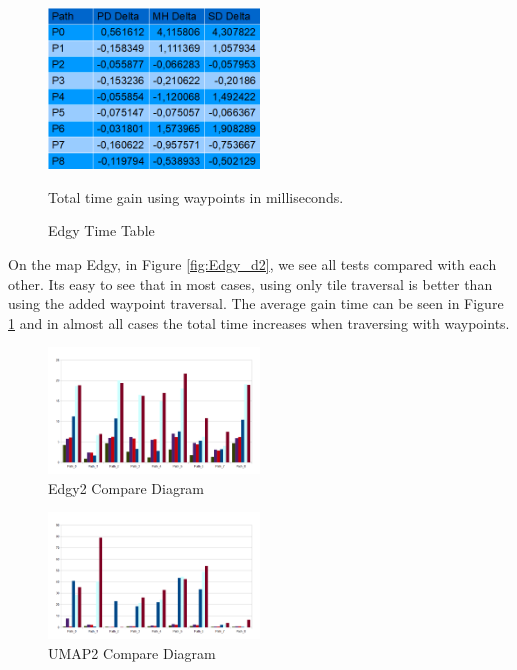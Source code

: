 \documentclass[a4paper]{article}
\begin{document}
\begin{figure}[h!]
\centering
\includegraphics[width=0.5\textwidth,height=\textheight,keepaspectratio]{ChartsAndFigures/Edgy_timeTable.png}
\caption{Edgy Time Table}
Total time gain using waypoints in milliseconds.
\label{fig:Edgy_cd}
\end{figure}

On the map Edgy, in Figure \ref{fig:Edgy_d2}, we see all tests compared with each other. Its easy to see that in most cases, using only tile traversal is better than using the added waypoint traversal.
The average gain time can be seen in Figure \ref{fig:Edgy_cd} and in almost all cases the total time increases when traversing with waypoints.
	
\begin{figure}[h!]
\centering
\includegraphics[width=0.5\textwidth,height=\textheight,keepaspectratio]{ChartsAndFigures/Edgy2_d2.png}
\caption{Edgy2 Compare Diagram}
\label{fig:Edgy2_d2}
\end{figure}

\begin{figure}[h!]
\centering
\includegraphics[width=0.5\textwidth,height=\textheight,keepaspectratio]{ChartsAndFigures/UMAP2_d2.png}
\caption{UMAP2 Compare Diagram}
\label{fig:UMAP2_d2}
\end{figure}
\end{document}
